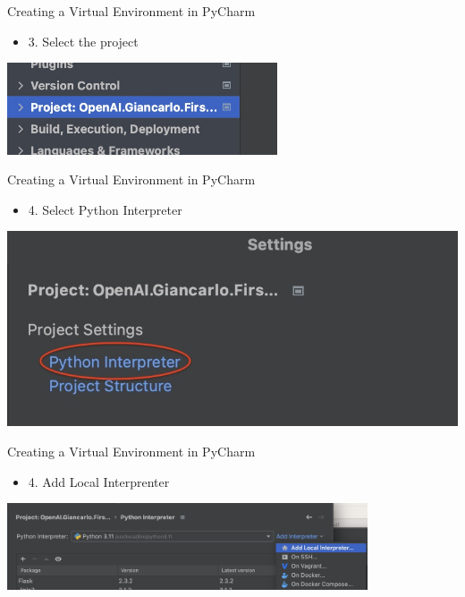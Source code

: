 \documentclass{beamer}
\begin{document}
\begin{frame}
{\centerline{Creating a Virtual Environment in PyCharm}}
\begin{itemize}
    \item 3. Select the project
\end{itemize} 
\begin{center}
    \includegraphics[width=0.6\textwidth]{Coding/PyCharm.Project.jpg}
\end{center}
\end{frame}

\begin{frame}
{\centerline{Creating a Virtual Environment in PyCharm}}
\begin{itemize}
    \item 4. Select Python Interpreter
\end{itemize} 
\begin{center}
    \includegraphics[width=\textwidth]{Coding/PyCharm.PhytonInterpreter.jpg}
\end{center}
\end{frame}

\begin{frame}
{\centerline{Creating a Virtual Environment in PyCharm}}
\begin{itemize}
    \item 4. Add Local Interprenter
\end{itemize} 
\begin{center}
    \includegraphics[width=0.8\textwidth]{Coding/PyCharm.AddLocalInterpreter.jpg}
\end{center}
\end{frame}
\end{document}
